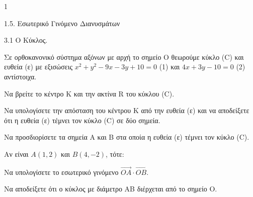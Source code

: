 \begin{ylh}{1}
    \item 1.5. Εσωτερικό Γινόμενο Διανυσμάτων
    \item 3.1 Ο Κύκλος.
\end{ylh}
Σε ορθοκανονικό σύστημα αξόνων με αρχή το σημείο Ο θεωρούμε κύκλο (C) και ευθεία (ε) με εξισώσεις $x^2 + y^2 - 9x - 3y + 10 = 0$ (1) και $4x + 3y - 10 = 0$ (2) αντίστοιχα.

\begin{alist}
\item
\begin{rlist}
    \item Να βρείτε το κέντρο Κ και την ακτίνα R του κύκλου (C). 
    \item Να υπολογίσετε την απόσταση του κέντρου Κ από την ευθεία (ε) και να αποδείξετε ότι η ευθεία (ε) τέμνει τον κύκλο (C) σε δύο σημεία. 
    \item Να προσδιορίσετε τα σημεία Α και Β στα οποία η ευθεία (ε) τέμνει τον κύκλο (C). 
\end{rlist}
\item Αν είναι $A(1,2)$ και $B(4, -2)$, τότε:
\begin{rlist}
    \item Να υπολογίσετε το εσωτερικό γινόμενο $\vec{OA} \cdot \vec{OB}$. 
    \item Να αποδείξετε ότι ο κύκλος με διάμετρο ΑΒ διέρχεται από το σημείο Ο. 
\end{rlist}
\end{alist}